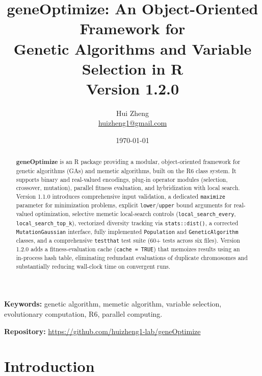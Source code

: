 \documentclass[11pt,a4paper]{article}
\title{%
  \textbf{geneOptimize: An Object-Oriented Framework for\\[4pt]
  Genetic Algorithms and Variable Selection in R}\\[6pt]
  \large Version 1.2.0
}
\author{
  Hui Zheng\\
  \small\href{mailto:huizheng1@gmail.com}{huizheng1@gmail.com}
}
\date{\today}
\begin{document}

\maketitle
\thispagestyle{empty}

\begin{abstract}
\noindent
\textbf{geneOptimize} is an R package providing a modular, object-oriented
framework for genetic algorithms (GAs) and memetic algorithms, built on the
R6 class system. It supports binary and real-valued encodings, plug-in
operator modules (selection, crossover, mutation), parallel fitness evaluation,
and hybridization with local search. Version 1.1.0 introduces comprehensive
input validation, a dedicated \texttt{maximize} parameter for minimization
problems, explicit \texttt{lower}/\texttt{upper} bound arguments for
real-valued optimization, selective memetic local-search controls
(\texttt{local\_search\_every}, \texttt{local\_search\_top\_k}), vectorized
diversity tracking via \texttt{stats::dist()}, a corrected
\texttt{MutationGaussian} interface, fully implemented \texttt{Population}
and \texttt{GeneticAlgorithm} classes, and a comprehensive \texttt{testthat}
test suite (60+ tests across six files).
Version 1.2.0 adds a fitness-evaluation cache (\texttt{cache = TRUE}) that
memoizes results using an in-process hash table, eliminating redundant
evaluations of duplicate chromosomes and substantially reducing wall-clock
time on convergent runs.
\end{abstract}

\vspace{4pt}
\noindent\textbf{Keywords:} genetic algorithm, memetic algorithm, variable
selection, evolutionary computation, R6, parallel computing.

\vspace{6pt}
\noindent\textbf{Repository:}
\url{https://github.com/huizheng1-lab/geneOptimize}

\tableofcontents
\clearpage

\section{Introduction}
\end{document}
